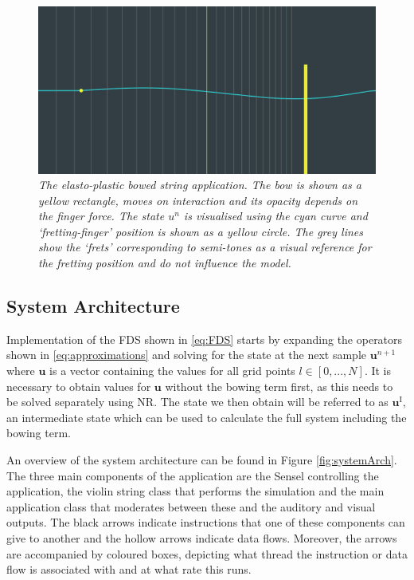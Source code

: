 \documentclass[twoside,a4paper,dvipsnames]{article}
\begin{document}
\begin{figure}[ht]
\centerline{\includegraphics[width=1.0\columnwidth]{JUCEapp.png}}
\caption{\label{fig:application}{\it The elasto-plastic bowed string application. The bow is shown as a yellow rectangle, moves on interaction and its opacity depends on the finger force. The state $u^n$ is visualised using the cyan curve and `fretting-finger' position is shown as a yellow circle. The grey lines show the `frets' corresponding to semi-tones as a visual reference for the fretting position and do not influence the model.}}
\end{figure}

\subsection{System Architecture}\label{sec:systemArch}
Implementation of the FDS shown in \eqref{eq:FDS} starts by expanding the operators shown in \eqref{eq:approximations} and solving for the state at the next sample $\mathbf{u}^{n+1}$ where $\mathbf{u}$ is a vector containing the values for all grid points $l\in[0,...,N]$. It is necessary to obtain values for $\mathbf{u}$ without the bowing term first, as this needs to be solved separately using NR. The state we then obtain will be referred to as $\mathbf{u}^\text{I}$, an intermediate state which can be used to calculate the full system including the bowing term.

An overview of the system architecture can be found in Figure \ref{fig:systemArch}. The three main components of the application are the Sensel controlling the application, the violin string class that performs the simulation and the main application class that moderates between these and the auditory and visual outputs. The black arrows indicate instructions that one of these components can give to another and the hollow arrows indicate data flows. Moreover, the arrows are accompanied by coloured boxes, depicting what thread the instruction or data flow is associated with and at what rate this runs. 
\end{document}
